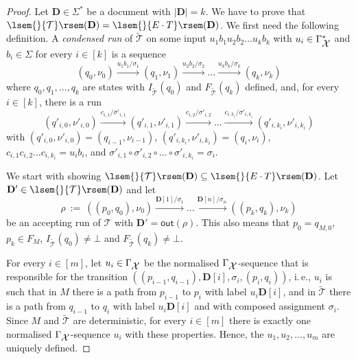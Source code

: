 \documentclass[
a4paper
]{article}
\theoremstyle{plain}
\theoremstyle{definition}
\theoremstyle{remark}
\newcommand{\varset}{\mbox{\ensuremath{\mathcal{X}}}}
\newcommand{\doc}{\ensuremath{\mathbf{D}}}
\newcommand{\sst}{\mathcal{T}}
\newcommand{\out}{\operatorname{out}}
\newcommand{\sem}[1]{{\lsem{}{#1}\rsem}}
\renewcommand{\operatorname}[1]{\textsf{#1}}
\begin{document}
\begin{proof}
Let $\doc \in \Sigma^*$ be a document with $|\doc| = k$. We have to prove that $\sem{\sst}(\doc) = \sem{E \cdot T}(\doc)$. We first need the following definition. A \emph{condensed run} of $\widetilde{\sst}$ on some input $u_1 b_1 u_2 b_2 \ldots u_k b_k$ with $u_i \in \Gamma_{\varset}^*$ and $b_i \in \Sigma$ for every $i \in [k]$ is a sequence
\begin{equation*}
(q_0, \nu_0) \xrightarrow{u_1 b_1/\sigma_1} (q_1, \nu_1) \xrightarrow{u_2 b_2 /\sigma_2} \ldots \xrightarrow{u_k b_k/\sigma_{k}} (q_k, \nu_k)
\end{equation*}
where $q_0, q_1, \ldots, q_k$ are states with $I_{\widetilde{\sst}}(q_0)$ and $F_{\widetilde{\sst}}(q_k)$ defined, and, for every $i \in [k]$, there is a run
\begin{equation*}
(q'_{i, 0}, \nu'_{i, 0}) \xrightarrow{c_{i, 1}/\sigma'_{i, 1}} (q'_{i, 1}, \nu'_{i, 1}) \xrightarrow{c_{i, 2} /\sigma'_{i, 2}} \ldots \xrightarrow{c_{i, k_i}/\sigma'_{i, k_i}} (q'_{i, k_{i}}, \nu'_{i, k_{i}})
\end{equation*}
with $(q'_{i, 0}, \nu'_{i, 0}) = (q_{i-1}, \nu_{i-1})$, $(q'_{i, k_i}, \nu'_{i, k_i}) = (q_i, \nu_i)$, $c_{i, 1} c_{i, 2} \ldots c_{i, k_i} = u_i b_i$, and $\sigma'_{i, 1} \circ \sigma'_{i, 2} \circ \ldots \circ \sigma'_{i, k_i} = \sigma_i$.

We start with showing $\sem{\sst}(\doc) \subseteq \sem{E \cdot T}(\doc)$. Let $\doc' \in \sem{\sst}(\doc)$ and let 
\begin{equation*}
\rho \ := \ ((p_0, q_0), \nu_0) \xrightarrow{\doc[1]/\sigma_1} 
\ldots \xrightarrow{\doc[n]/\sigma_{n}} ((p_k, q_k), \nu_k)
\end{equation*}
be an accepting run of $\sst$ with $\doc' = \out(\rho)$. This also means that $p_0 = q_{M, 0}$, $p_k \in F_M$, $I_{\widetilde{\sst}}(q_0) \neq \bot$ and $F_{\widetilde{\sst}}(q_k) \neq \bot$. 

For every $i \in [m]$, let $u_i \in \Gamma_{\varset}$ be the normalised $\Gamma_{\varset}$-sequence that is responsible for the transition $((p_{i-1}, q_{i-1}), \doc[i], \sigma_i, (p_i, q_i))$, i.\,e., $u_i$ is such that in $M$ there is a path from $p_{i-1}$ to $p_i$ with label $u_i \doc[i]$, and in $\widetilde{\sst}$ there is a path from $q_{i-1}$ to $q_i$ with label $u_i \doc[i]$ and with composed assignment $\sigma_i$. Since $M$ and $\widetilde{\sst}$ are deterministic, for every $i \in [m]$ there is exactly one normalised $\Gamma_{\varset}$-sequence $u_i$ with these properties. Hence, the $u_1, u_2, \ldots, u_m$ are uniquely defined. 


\end{proof}
\end{document}
